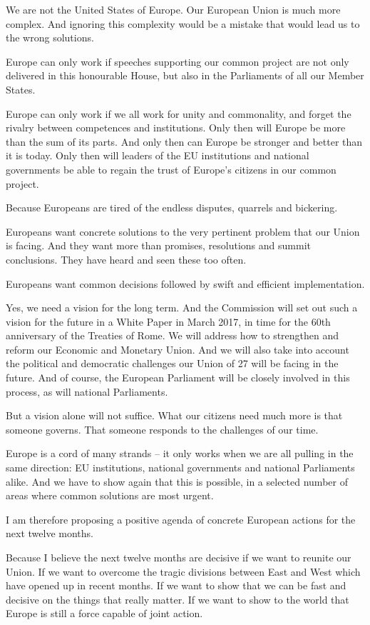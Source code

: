 \documentclass[a4paper,11pt]{article}
\begin{document}
We are not the United States of Europe. Our European Union is much more complex. And ignoring this complexity would be a mistake that would lead us to the wrong solutions.

Europe can only work if speeches supporting our common project are not only delivered in this honourable House, but also in the Parliaments of all our Member States.

Europe can only work if we all work for unity and commonality, and forget the rivalry between competences and institutions. Only then will Europe be more than the sum of its parts. And only then can Europe be stronger and better than it is today. Only then will leaders of the EU institutions and national governments be able to regain the trust of Europe's citizens in our common project.

Because Europeans are tired of the endless disputes, quarrels and bickering.

Europeans want concrete solutions to the very pertinent problem that our Union is facing. And they want more than promises, resolutions and summit conclusions. They have heard and seen these too often.

Europeans want common decisions followed by swift and efficient implementation.

Yes, we need a vision for the long term. And the Commission will set out such a vision for the future in a White Paper in March 2017, in time for the 60th anniversary of the Treaties of Rome. We will address how to strengthen and reform our Economic and Monetary Union. And we will also take into account the political and democratic challenges our Union of 27 will be facing in the future. And of course, the European Parliament will be closely involved in this process, as will national Parliaments.

But a vision alone will not suffice. What our citizens need much more is that someone governs. That someone responds to the challenges of our time.

Europe is a cord of many strands – it only works when we are all pulling in the same direction: EU institutions, national governments and national Parliaments alike. And we have to show again that this is possible, in a selected number of areas where common solutions are most urgent.

I am therefore proposing a positive agenda of concrete European actions for the next twelve months.

Because I believe the next twelve months are decisive if we want to reunite our Union. If we want to overcome the tragic divisions between East and West which have opened up in recent months. If we want to show that we can be fast and decisive on the things that really matter. If we want to show to the world that Europe is still a force capable of joint action.
\end{document}
